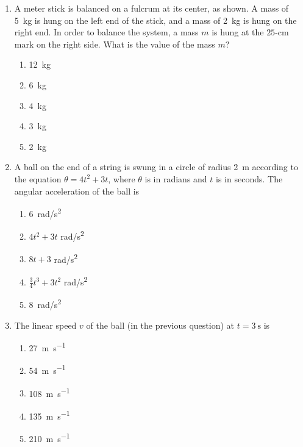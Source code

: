 \documentclass{../../oss-apphys}
\begin{document}
\begin{multicols}{2}
\begin{enumerate}[leftmargin=18pt]
  \item A meter stick is balanced on a fulcrum at its center, as shown. A mass
    of \SI{5}{\kilo\gram} is hung on the left end of the stick, and a mass of
    \SI{2}{\kilo\gram} is hung on the right end. In order to balance the
    system, a mass $m$ is hung at the $25$-\si{\centi\metre} mark on the right
    side. What is the value of the mass $m$?
    \begin{center}
    \end{center}
    \begin{enumerate}[noitemsep,topsep=0pt,leftmargin=18pt,label=(\Alph*)]
    \item\SI{12}{\kilo\gram}
    \item\SI{6 }{\kilo\gram}
    \item\SI{4 }{\kilo\gram}
    \item\SI{3 }{\kilo\gram}
    \item\SI{2 }{\kilo\gram}
    \end{enumerate}
    
  \item A ball on the end of a string is swung in a circle of radius
    \SI{2}{\metre} according to the equation $\theta = 4t^2+3t$, where $\theta$
    is in radians and $t$ is in seconds. The angular acceleration of the ball
    is
    \begin{enumerate}[noitemsep,topsep=0pt,leftmargin=18pt,label=(\Alph*)]
    \item\SI{6}{rad/s^2}
    \item $4t^2 + 3t$ \si{rad/s^2}
    \item $8t +3$ \si{rad/s^2}
    \item $\displaystyle\frac{3}{4} t^3 + 3t^2$ \si{rad/s^2}
    \item \SI{8}{rad/s^2}
    \end{enumerate}
    \columnbreak
  
  \item The linear speed $v$ of the ball (in the previous question) at
    $t=\SI{3}{\second}$ is
    \begin{enumerate}[noitemsep,topsep=0pt,leftmargin=18pt,label=(\Alph*)]
    \item\SI{27 }{\metre\per\second}
    \item\SI{54 }{\metre\per\second}
    \item\SI{108}{\metre\per\second}
    \item\SI{135}{\metre\per\second}
    \item\SI{210}{\metre\per\second}
    \end{enumerate}


\end{enumerate}
\end{multicols}
\end{document}
